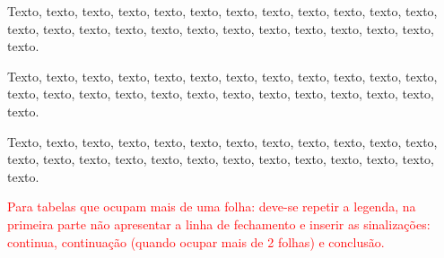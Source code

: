 Texto, texto, texto, texto, texto, texto, texto, texto, texto, texto, texto, texto, texto, texto, texto, texto, texto, texto, texto, texto, texto, texto, texto, texto, texto. 

Texto, texto, texto, texto, texto, texto, texto, texto, texto, texto, texto, texto, texto, texto, texto, texto, texto, texto, texto, texto, texto, texto, texto, texto, texto. 

Texto, texto, texto, texto, texto, texto, texto, texto, texto, texto, texto, texto, texto, texto, texto, texto, texto, texto, texto, texto, texto, texto, texto, texto, texto.

\vspace{1.5cm}

\textcolor{red}{Para tabelas que ocupam mais de uma folha: deve-se repetir a legenda, na primeira parte não apresentar a linha de fechamento e inserir as sinalizações: continua, continuação (quando ocupar mais de 2 folhas) e conclusão.}

